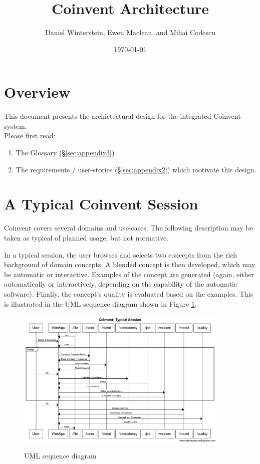 \documentclass[10pt]{article}
\author{Daniel Winterstein, Ewen Maclean, and Mihai Codescu}
\title{Coinvent Architecture}
\date{\today}
\begin{document}
\maketitle

\section{Overview}\label{sec:overview}

This document presents the archictectural design for the integrated Coinvent system. \mbox{}\\
Please first read:
\begin{enumerate}
\item{The Glossary (\S\ref{sec:appendix3})}
\item{The requirements / user-stories (\S\ref{sec:appendix2}) which motivate this design.}
\end{enumerate}

\section{A Typical Coinvent Session}\label{sec:typical}

Coinvent covers several domains and use-cases. The following description may be taken
as typical of planned usage, but not normative.

In a typical session, the user browses and selects two concepts from the 
rich background of domain concepts. A blended concept is then developed, which
may be automatic or interactive. Examples of the concept are generated (again, either
automatically or interactively, depending on the capability of the automatic software). Finally, the concept's quality is evaluated based on the examples.
This is illustrated in the UML sequence diagram shown in Figure \ref{fig:sequence-diagram}.
\begin{figure}[!ht]
\includegraphics[width=0.9\textwidth]{sequence-diagram.png}
\label{fig:sequence-diagram}
\caption{UML sequence diagram}
\end{figure}
\end{document}
